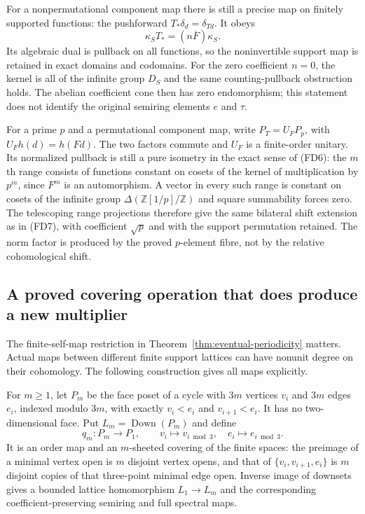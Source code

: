 \documentclass[11pt,a4paper]{article}
\theoremstyle{definition}\newtheorem{definition}[theorem]{Definition}
\newcommand{\Z}{\mathbb Z}\newcommand{\Q}{\mathbb Q}
\providecommand{\Down}{\operatorname{Down}}
\begin{document}
For a nonpermutational component map there is still a precise map
on finitely supported functions: the pushforward
$T_*\delta_d=\delta_{Td}$. It obeys
\[
 \kappa_ST_*=(n\overline F)\kappa_S.
 \tag{SE28}\label{eq:pushforward-all-maps}
\]
Its algebraic dual is pullback on all functions, so the noninvertible
support map is retained in exact domains and codomains. For the
zero coefficient $n=0$, the kernel is all of the infinite group
$D_S$ and the same counting-pullback obstruction holds. The abelian
coefficient cone then has zero endomorphism; this statement does
not identify the original semiring elements $e$ and $\tau$.

For a prime $p$ and a permutational component map, write
$P_T=U_F P_p$, with $U_Fh(d)=h(Fd)$. The two factors commute and
$U_F$ is a finite-order unitary. Its normalized pullback is still
a pure isometry in the exact sense of (FD6): the $m$th range consists
of functions constant on cosets of the kernel of multiplication by
$p^m$, since $F^m$ is an automorphism. A vector in every such range
is constant on cosets of the infinite group
$\Delta(\Z[1/p]/\Z)$ and square summability forces zero. The
telescoping range projections therefore give the same bilateral
shift extension as in (FD7), with coefficient $\sqrt p$ and with
the support permutation retained. The norm factor is produced by
the proved $p$-element fibre, not by the relative cohomological shift.

\subsection{A proved covering operation that does produce a new multiplier}

The finite-self-map restriction in
Theorem~\ref{thm:eventual-periodicity} matters. Actual maps between
different finite support lattices can have nonunit degree on their
cohomology. The following construction gives all maps explicitly.

For $m\ge1$, let $P_m$ be the face poset of a cycle with $3m$ vertices
$v_i$ and $3m$ edges $e_i$, indexed modulo $3m$, with exactly
$v_i<e_i$ and $v_{i+1}<e_i$. It has no two-dimensional face. Put
$L_m=\Down(P_m)$ and define
\[
 q_m:P_m\to P_1,\qquad v_i\mapsto v_{i\bmod3},\quad
 e_i\mapsto e_{i\bmod3}.
 \tag{SE29}\label{eq:cycle-cover}
\]
It is an order map and an $m$-sheeted covering of the finite spaces:
the preimage of a minimal vertex open is $m$ disjoint vertex opens,
and that of $\{v_i,v_{i+1},e_i\}$ is $m$ disjoint copies of that
three-point minimal edge open. Inverse image of downsets gives a
bounded lattice homomorphism $L_1\to L_m$ and the corresponding
coefficient-preserving semiring and full spectral maps.
\end{document}
